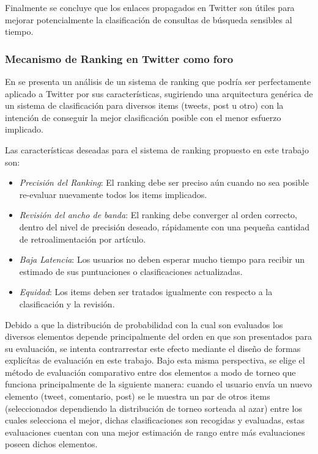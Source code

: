 	Finalmente se concluye que los enlaces propagados en Twitter son útiles para mejorar potencialmente la clasificación de consultas de búsqueda sensibles al tiempo.
\subsubsection{Mecanismo de Ranking en Twitter como foro}

	 En \cite{DasSarma:2010:RMT:1718487.1718491} se presenta un análisis de un sistema
de ranking que podría ser perfectamente aplicado a Twitter por sus características, sugiriendo una arquitectura genérica de un sistema de clasificación para diversos items (tweets, post u otro) con la intención de conseguir la mejor clasificación posible con el menor esfuerzo implicado.

Las características deseadas para el sistema de ranking propuesto en este trabajo son:

	\begin{itemize}
		\item \emph{Precisión del Ranking}: El ranking debe ser preciso aún cuando no sea posible re-evaluar nuevamente todos los items implicados.
		\item \emph{Revisión del ancho de banda}: El ranking debe converger al orden correcto, dentro del nivel de precisión deseado, rápidamente con una pequeña cantidad de retroalimentación por artículo.
		\item \emph{Baja Latencia}: Los usuarios no deben esperar mucho tiempo para recibir un estimado de sus puntuaciones o clasificaciones actualizadas.
		\item \emph{Equidad}: Los items deben ser tratados igualmente con respecto a la clasificación y la revisión.
	\end{itemize}

	Debido a que la distribución de probabilidad con la cual son evaluados los diversos elementos depende principalmente del orden en que son presentados para su evaluación, se intenta contrarrestar este efecto mediante el diseño de formas explicítas de evaluación en este trabajo. Bajo esta misma perspectiva, se elige
	el método de evaluación comparativo entre dos elementos a modo de torneo que funciona principalmente de la siguiente manera: cuando el usuario envía un nuevo elemento (tweet, comentario, post) se le muestra un par de otros items (seleccionados dependiendo la distribución de torneo sorteada al azar) entre los cuales selecciona el mejor, dichas clasificaciones son recogidas y evaluadas, estas evaluaciones cuentan con una mejor estimación de rango entre más evaluaciones poseen dichos elementos.
	
